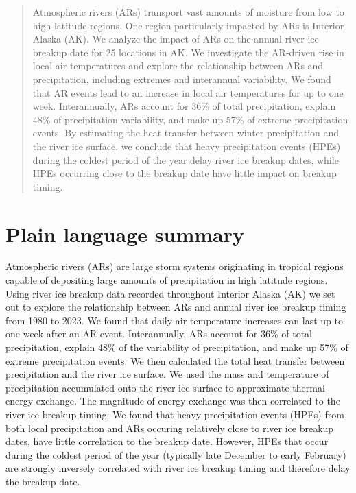 \documentclass[12pts,draft]{AR_analysis_}
\begin{document}
\begin{abstract}
	
	Atmospheric rivers (ARs) transport vast amounts of moisture 
	from low to high latitude regions. One region particularly 
	impacted by ARs is Interior Alaska (AK). We analyze the impact 
	of ARs on the annual river ice breakup date for 25 locations 
	in AK. We investigate the AR-driven rise in local air temperatures 
	and explore the relationship between ARs and precipitation, 
	including extremes and interannual variability. We found that 
	AR events lead to an increase in local air temperatures
	for up to one week. Interannually, ARs account 
	for 36\% of total precipitation, explain 48\% of precipitation 
	variability, and make up 57\% of extreme precipitation events. 
	By estimating the heat transfer between winter precipitation
	and the river ice surface, we 
	conclude that heavy precipitation events (HPEs) during the 
	coldest period of the year delay river ice breakup dates, 
	while HPEs occurring close to the breakup date have little 
	impact on breakup timing.

\end{abstract}


\section*{Plain language summary}

	Atmospheric rivers (ARs) are large storm systems originating in
	tropical regions capable of depositing large amounts of
	precipitation in high latitude regions. 
	Using river ice breakup data recorded throughout Interior
	Alaska (AK) we set out to explore the relationship between
	ARs and annual river ice breakup timing from 1980 to 2023. 
	We found that 
	daily air temperature increases can last up to
	one week after an AR event. Interannually, ARs
	account for 36\% of total precipitation, 
	explain 48\% of the variability of precipitation, and make up 57\% 
	of extreme precipitation events. We then
	calculated the total heat transfer between precipitation 
	and the river ice surface. We used the mass and temperature 
	of precipitation accumulated onto the river ice surface to approximate 
	thermal energy exchange. The magnitude of energy exchange was then
	correlated to the river ice breakup timing. We found that heavy 
	precipitation events (HPEs)
	from both local precipitation and ARs occuring relatively close to
	river ice breakup dates, have little correlation to the breakup
	date. However, HPEs that occur during the coldest period of the
	year (typically late December to early February) are strongly inversely
	correlated with river ice breakup timing and therefore delay
	the breakup date.
\end{document}
